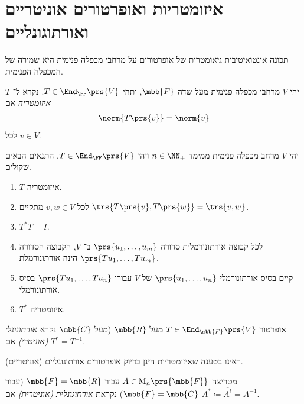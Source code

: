 \documentclass[a4paper,10pt,twoside,openany]{book}
\renewcommand{\Mat}{\mathrm{M}}
\begin{document}
\section{איזומטריות ואופרטורים אוניטריים ואורתוגונליים}

תכונה אינטואיטיבית גיאומטרית של אופרטורים על מרחבי מכפלה פנימית היא שמירה של המכפלה הפנימית.

\begin{definition}
יהי
$V$
מרחבי מכפלה פנימית מעל שדה
$\mbb{F}$,
ותהי
$T \in \End_\FF\prs{V}$.
נקרא ל־%
$T$
\emph{איזומטריה}
אם
\begin{align*}
\norm{T\prs{v}} = \norm{v}
\end{align*}
לכל
$v \in V$.
\end{definition}

\begin{proposition}
יהי
$V$
מרחב מכפלה פנימית ממימד
$n \in \NN_+$
ויהי
$T \in \End_\FF\prs{V}$.
התנאים הבאים שקולים.

\begin{enumerate}
\item $T$ איזומטריה.
\item לכל
$v,w \in V$
מתקיים
$\trs{T\prs{v}, T\prs{w}} = \trs{v,w}$.
\item $T^* T = I$.
\item לכל קבוצה אורתונורמלית סדורה
$\prs{u_1, \ldots, u_m}$
ב־%
$V$,
הקבוצה הסדורה
$\prs{T u_1, \ldots, T u_m}$
הינה אורתונורמלת.
\item קיים בסיס אורתונורמלי
$\prs{u_1, \ldots, u_n}$
של
$V$
עבורו
$\prs{T u_1, \ldots, T u_n}$
בסיס אורתונורמלי.
\item $T^*$
איזומטריה.
\end{enumerate}
\end{proposition}

\begin{definition}
אופרטור
$T \in \End_{\mbb{F}}\prs{V}$
מעל
$\mbb{R}$
(מעל
$\mbb{C}$
נקרא
\emph{אורתוגונלי (אוניטרי)}
אם
$T^* = T^{-1}$.
\end{definition}

\begin{remark}
ראינו בטענה שאיזומטריות הינן בדיוק אופרטורים אורתוגונליים (אוניטריים).
\end{remark}

\begin{definition}
מטריצה
$A \in \Mat_n\prs{\mbb{F}}$
עבור
$\mbb{F} = \mbb{R}$
(עבור
$\mbb{F} = \mbb{C}$)
נקראת
\emph{אורתוגונלית (אוניטרית)}
אם
$A^* \coloneqq \overline{A^t} = A^{-1}$.
\end{definition}
\end{document}
